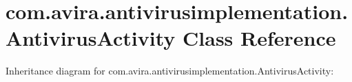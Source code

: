 \hypertarget{classcom_1_1avira_1_1antivirusimplementation_1_1_antivirus_activity}{}\section{com.\+avira.\+antivirusimplementation.\+Antivirus\+Activity Class Reference}
\label{classcom_1_1avira_1_1antivirusimplementation_1_1_antivirus_activity}


Inheritance diagram for com.\+avira.\+antivirusimplementation.\+Antivirus\+Activity\+:
